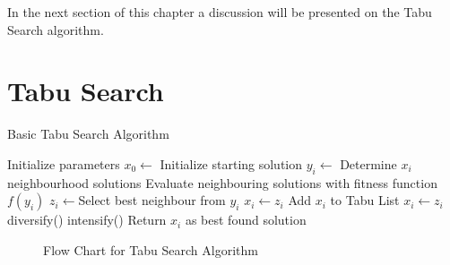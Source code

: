 In the next section of this chapter a discussion will be presented on the Tabu Search algorithm.

\section{Tabu Search}
\begin{algorithm}
\caption{Basic Tabu Search Algorithm}
\label{alg:TS}
	\begin{algorithmic}[1]
		\STATE Initialize parameters
		\STATE $x_0 \leftarrow$ Initialize starting solution
			\STATE $y_i \leftarrow$ Determine $x_i$ neighbourhood solutions 
			\STATE Evaluate neighbouring solutions with fitness function $f(y_i)$
			\STATE $z_i \leftarrow$Select best neighbour from $y_i$
					\STATE $x_i \leftarrow z_i$
				\ENDIF
			\ELSE
				\STATE Add $x_i$ to Tabu List
				\STATE $x_i \leftarrow z_i$
					\STATE diversify()
				\ELSE
					\STATE intensify()
				\ENDIF
			\ENDIF
		\ENDWHILE
		\STATE Return $x_i$ as best found solution
	\end{algorithmic}
\end{algorithm}
\begin{figure}[p!]
	\begin{center}
	\caption{Flow Chart for Tabu Search Algorithm}
	\label{fig:TSAlgorithmFlowChart}
	\end{center}
\end{figure}
